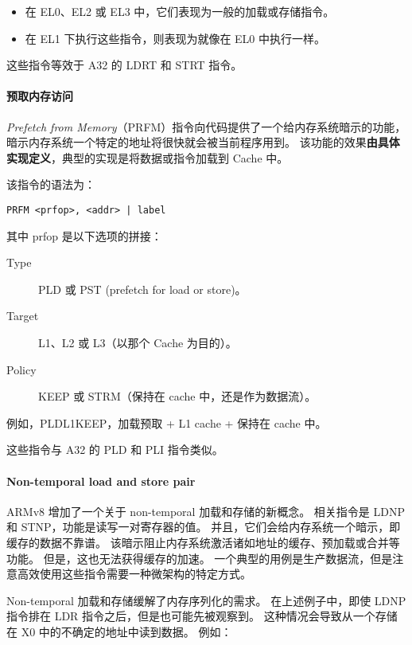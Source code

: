 \begin{itemize}
  \item 在 EL0、EL2 或 EL3 中，它们表现为一般的加载或存储指令。
  \item 在 EL1 下执行这些指令，则表现为就像在 EL0 中执行一样。
\end{itemize}
 
这些指令等效于 A32 的 LDRT 和 STRT 指令。

\paragraph{预取内存访问}

\textit{Prefetch from Memory}（PRFM）指令向代码提供了一个给内存系统暗示的功能，暗示内存系统一个特定的地址将很快就会被当前程序用到。
该功能的效果\textbf{由具体实现定义}，典型的实现是将数据或指令加载到 Cache 中。

该指令的语法为：

\lstinline!PRFM <prfop>, <addr> | label!

其中 prfop 是以下选项的拼接：

\begin{description}
  \item[Type] PLD 或 PST (prefetch for load or store)。
  \item[Target] L1、L2 或 L3（以那个 Cache 为目的）。
  \item[Policy] KEEP 或 STRM（保持在 cache 中，还是作为数据流）。
\end{description}

例如，PLDL1KEEP，加载预取 + L1 cache + 保持在 cache 中。

这些指令与 A32 的 PLD 和 PLI 指令类似。

\paragraph{Non-temporal load and store pair}

ARMv8 增加了一个关于 non-temporal 加载和存储的新概念。
相关指令是 LDNP 和 STNP，功能是读写一对寄存器的值。
并且，它们会给内存系统一个暗示，即缓存的数据不靠谱。
该暗示阻止内存系统激活诸如地址的缓存、预加载或合并等功能。
但是，这也无法获得缓存的加速。
一个典型的用例是生产数据流，但是注意高效使用这些指令需要一种微架构的特定方式。

Non-temporal 加载和存储缓解了内存序列化的需求。
在上述例子中，即使 LDNP 指令排在 LDR 指令之后，但是也可能先被观察到。
这种情况会导致从一个存储在 X0 中的不确定的地址中读到数据。
例如：

